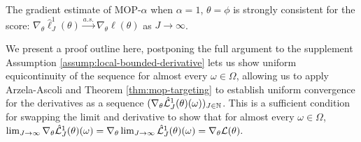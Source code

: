 \documentclass[9pt,twocolumn,pnasresearcharticle]{pnas-new}
\newcommand\arxiv[2]{#2} %
\begin{document}
\begin{thm}
    The gradient estimate of MOP-$\alpha$ when $\alpha=1$, $\theta=\phi$ is strongly consistent for the score: $\nabla_\theta \hat\ell_J^1(\theta) \stackrel{a.s.}{\to} \nabla_\theta \ell(\theta)$ as $J \to \infty$.
    \label{thm:mop-grad-consistency}
\end{thm}


We present a proof outline here, postponing the full argument to \arxiv{Appendix~\ref{appendix:consistency}}{the supplement}
Assumption \ref{assump:local-bounded-derivative} lets us show uniform equicontinuity of the sequence for almost every $\omega \in \Omega$, allowing us to apply Arzela-Ascoli and Theorem \ref{thm:mop-targeting} to establish uniform convergence for the derivatives as a sequence $(\nabla_\theta \hat{\mathcal{L}}_J^1(\theta)(\omega))_{J \in \mathbb{N}}$. This is a sufficient condition for swapping the limit and derivative to show that for almost every $\omega \in \Omega$, $\lim_{J \to \infty} \nabla_\theta \hat{\mathcal{L}}_J^1(\theta)(\omega) = \nabla_\theta \lim_{J \to \infty} \hat{\mathcal{L}}_J^1(\theta)(\omega) = \nabla_\theta \mathcal{L}(\theta).$


    
\end{document}
